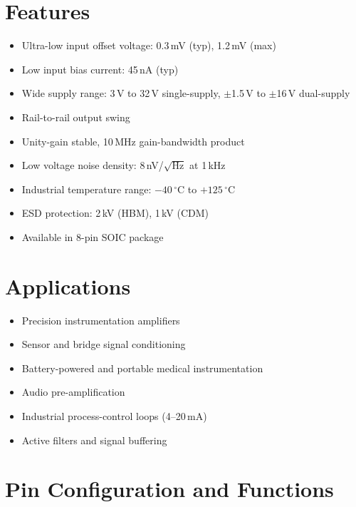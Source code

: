 \documentclass[10pt,a4paper]{article}
\begin{document}
\section{Features}
\begin{itemize}
  \item Ultra-low input offset voltage: 0.3\,mV (typ), 1.2\,mV (max)
  \item Low input bias current: 45\,nA (typ)
  \item Wide supply range: 3\,V to 32\,V single-supply, $\pm$1.5\,V to $\pm$16\,V dual-supply
  \item Rail-to-rail output swing
  \item Unity-gain stable, 10\,MHz gain-bandwidth product
  \item Low voltage noise density: 8\,nV/$\sqrt{\text{Hz}}$ at 1\,kHz
  \item Industrial temperature range: $-40\,^{\circ}$C to $+125\,^{\circ}$C
  \item ESD protection: 2\,kV (HBM), 1\,kV (CDM)
  \item Available in 8-pin SOIC package
\end{itemize}

\section{Applications}
\begin{itemize}
  \item Precision instrumentation amplifiers
  \item Sensor and bridge signal conditioning
  \item Battery-powered and portable medical instrumentation
  \item Audio pre-amplification
  \item Industrial process-control loops (4--20\,mA)
  \item Active filters and signal buffering
\end{itemize}

\section{Pin Configuration and Functions}
\end{document}
